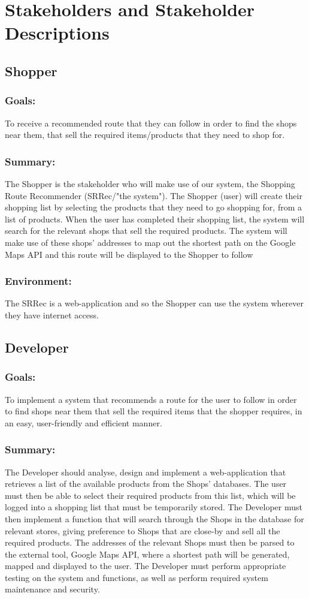\documentclass[12pt]{article}
\begin{document}
\section{Stakeholders and Stakeholder Descriptions}
\subsection{Shopper}
\subsubsection{Goals:}
To receive a recommended route that they can follow in order to find the shops near them, that sell the required items/products that they need to shop for.
\subsubsection{Summary:}
The Shopper is the stakeholder who will make use of our system, the Shopping Route Recommender (SRRec/"the system"). The Shopper (user) will create their shopping list by selecting the products that they need to go shopping for, from a list of products. When the user has completed their shopping list, the system will search for the relevant shops that sell the required products. The system will make use of these shops' addresses to map out the shortest path on the Google Maps API and this route will be displayed to the Shopper to follow
\subsubsection{Environment:}
The SRRec is a web-application and so the Shopper can use the system wherever they have internet
access.
\subsection{Developer}
\subsubsection{Goals:}
To implement a system that recommends a route for the user to follow in order to find shops near them that sell the required items that the shopper requires, in an easy, user-friendly and efficient manner.
\subsubsection{Summary:}
The Developer should analyse, design and implement a web-application that retrieves a list of the
available products from the Shops’ databases. The user must then be able to select their required
products from this list, which will be logged into a shopping list that must be temporarily stored. The
Developer must then implement a function that will search through the Shops in the database for
relevant stores, giving preference to Shops that are close-by and sell all the required products. The
addresses of the relevant Shops must then be parsed to the external tool, Google Maps API, where a
shortest path will be generated, mapped and displayed to the user. The Developer must perform
appropriate testing on the system and functions, as well as perform required system maintenance
and security.
\end{document}
